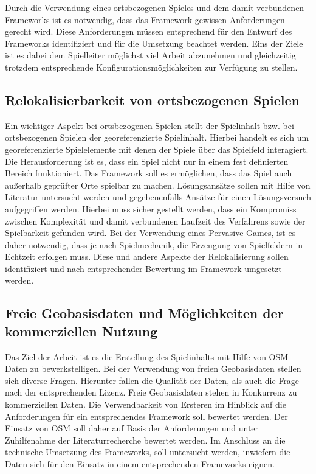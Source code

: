 Durch die Verwendung eines ortsbezogenen Spieles und dem damit verbundenen Frameworks ist es notwendig, dass das Framework gewissen Anforderungen gerecht wird. Diese Anforderungen müssen entsprechend für den Entwurf des Frameworks identifiziert und für die Umsetzung beachtet werden. Eins der Ziele ist es dabei dem Spielleiter möglichst viel Arbeit abzunehmen und gleichzeitig trotzdem entsprechende Konfigurationsmöglichkeiten zur Verfügung zu stellen.

\subsection*{Relokalisierbarkeit von ortsbezogenen Spielen}

Ein wichtiger Aspekt bei ortsbezogenen Spielen stellt der Spielinhalt bzw. bei ortsbezogenen Spielen der georeferenzierte Spielinhalt. Hierbei handelt es sich um georeferenzierte Spielelemente mit denen der Spiele über das Spielfeld interagiert. Die Herausforderung ist es, dass ein Spiel nicht nur in einem fest definierten Bereich funktioniert. Das Framework soll es ermöglichen, dass das Spiel auch außerhalb geprüfter Orte spielbar zu machen. Lösungsansätze sollen mit Hilfe von Literatur untersucht werden und gegebenenfalls Ansätze für einen Lösungsversuch aufgegriffen werden. Hierbei muss sicher gestellt werden, dass ein Kompromiss zwischen Komplexität und damit verbundenen Laufzeit des Verfahrens sowie der Spielbarkeit gefunden wird. Bei der Verwendung eines Pervasive Games, ist es daher notwendig, dass je nach Spielmechanik, die Erzeugung von Spielfeldern in Echtzeit erfolgen muss. Diese und andere Aspekte der Relokalisierung sollen identifiziert und nach entsprechender Bewertung im Framework umgesetzt werden.

\subsection*{Freie Geobasisdaten und Möglichkeiten der kommerziellen Nutzung}

Das Ziel der Arbeit ist es die Erstellung des Spielinhalts mit Hilfe von OSM-Daten zu bewerkstelligen.
Bei der Verwendung von freien Geobasisdaten stellen sich diverse Fragen. Hierunter fallen die Qualität der Daten, als auch die Frage nach der entsprechenden Lizenz. Freie Geobasisdaten stehen in Konkurrenz zu kommerziellen Daten. Die Verwendbarkeit von Ersteren im Hinblick auf die Anforderungen für ein entsprechendes Framework soll bewertet werden.
Der Einsatz von OSM soll daher auf Basis der Anforderungen und unter Zuhilfenahme der Literaturrecherche bewertet werden. Im Anschluss an die technische Umsetzung des Frameworks, soll untersucht werden, inwiefern die Daten sich für den Einsatz in einem entsprechenden Frameworks eignen.
